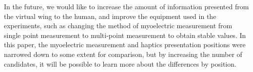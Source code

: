 \documentclass[letterpaper, 10 pt, conference]{ieeeconf}  %
\begin{document}
        In the future, we would like to increase the amount of information presented from the virtual wing to the human, and improve the equipment used in the experiments, such as changing the method of myoelectric measurement from single point measurement to multi-point measurement to obtain stable values. 
        In this paper, the myoelectric measurement and haptics presentation positions were narrowed down to some extent for comparison, but by increasing the number of candidates, it will be possible to learn more about the differences by position.






\end{document}
